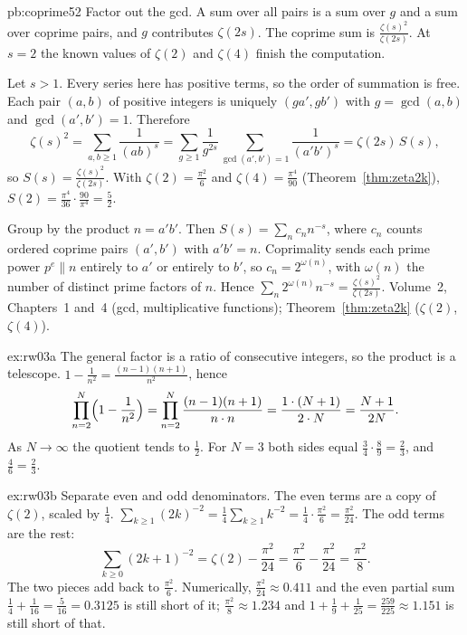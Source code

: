 \begin{solution}{pb:coprime52}
\idea Factor out the gcd. A sum over all pairs is a sum over $g$ and a sum over coprime pairs, and $g$ contributes $\zeta(2s)$. The coprime sum is $\frac{\zeta(s)^2}{\zeta(2s)}$. At $s=2$ the known values of $\zeta(2)$ and $\zeta(4)$ finish the computation.

\writeup Let $s>1$. Every series here has positive terms, so the order of summation is free. Each pair $(a,b)$ of positive integers is uniquely $(ga',gb')$ with $g=\gcd(a,b)$ and $\gcd(a',b')=1$. Therefore
\[
\zeta(s)^2=\sum_{a,b\ge1}\frac1{(ab)^s}=\sum_{g\ge1}\frac1{g^{2s}}\sum_{\gcd(a',b')=1}\frac1{(a'b')^s}=\zeta(2s)\,S(s),
\]
so $S(s)=\frac{\zeta(s)^2}{\zeta(2s)}$. With $\zeta(2)=\frac{\pi^2}6$ and $\zeta(4)=\frac{\pi^4}{90}$ (Theorem~\ref{thm:zeta2k}),
$S(2)=\frac{\pi^4}{36}\cdot\frac{90}{\pi^4}=\frac52$.

Group by the product $n=a'b'$. Then $S(s)=\sum_nc_nn^{-s}$, where $c_n$ counts ordered coprime pairs $(a',b')$ with $a'b'=n$. Coprimality sends each prime power $p^e\parallel n$ entirely to $a'$ or entirely to $b'$, so $c_n=2^{\omega(n)}$, with $\omega(n)$ the number of distinct prime factors of $n$. Hence $\sum_n2^{\omega(n)}n^{-s}=\frac{\zeta(s)^2}{\zeta(2s)}$.
\tools Volume~2, Chapters~1 and~4 (gcd, multiplicative functions); Theorem~\ref{thm:zeta2k} ($\zeta(2)$, $\zeta(4)$).
\end{solution}

\begin{solution}{ex:rw03a}
\idea The general factor is a ratio of consecutive integers, so the product is a telescope.
\writeup $1-\frac1{n^2}=\frac{(n-1)(n+1)}{n^2}$, hence
\[
\prod_{n=2}^N\Bigl(1-\frac1{n^2}\Bigr)=\prod_{n=2}^N\frac{(n-1)(n+1)}{n\cdot n}=\frac{1\cdot(N+1)}{2\cdot N}=\frac{N+1}{2N}.
\]
As $N\to\infty$ the quotient tends to $\frac12$. For $N=3$ both sides equal $\frac34\cdot\frac89=\frac23$, and $\frac{4}{6}=\frac23$.
\end{solution}

\begin{solution}{ex:rw03b}
\idea Separate even and odd denominators. The even terms are a copy of $\zeta(2)$, scaled by $\frac14$.
\writeup $\sum_{k\ge1}(2k)^{-2}=\frac14\sum_{k\ge1}k^{-2}=\frac14\cdot\frac{\pi^2}6=\frac{\pi^2}{24}$. The odd terms are the rest:
\[
\sum_{k\ge0}(2k+1)^{-2}=\zeta(2)-\frac{\pi^2}{24}=\frac{\pi^2}6-\frac{\pi^2}{24}=\frac{\pi^2}8.
\]
The two pieces add back to $\frac{\pi^2}6$. Numerically, $\frac{\pi^2}{24}\approx0.411$ and the even partial sum $\frac14+\frac1{16}=\frac5{16}=0.3125$ is still short of it; $\frac{\pi^2}8\approx1.234$ and $1+\frac19+\frac1{25}=\frac{259}{225}\approx1.151$ is still short of that.
\end{solution}

